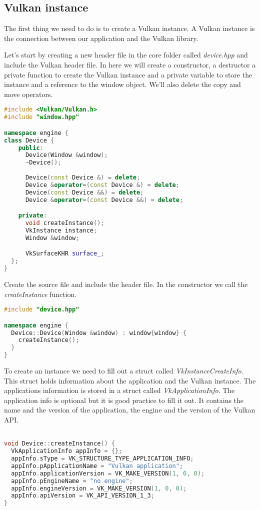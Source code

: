 \documentclass[12pt]{report} \usepackage{preamble}
\begin{document}
\subsection{Vulkan instance}

The first thing we need to do is to create a Vulkan instance.
A Vulkan instance is the connection between our application and the Vulkan library.

Let's start by creating a new header file in the core folder called \textit{device.hpp}
and include the Vulkan header file. In here we will create a constructor, a destructor
a private function to create the Vulkan instance and a private variable to store the instance
and a reference to the window object. We'll also delete the copy and move operators.

\begin{lstlisting}[language=C++]
#include <Vulkan/Vulkan.h>
#include "window.hpp"

namespace engine {
class Device {
    public:
      Device(Window &window);
      ~Device();
      
      Device(const Device &) = delete;
      Device &operator=(const Device &) = delete;
      Device(const Device &&) = delete;
      Device &operator=(const Device &&) = delete;

    private:
      void createInstance();
      VkInstance instance;
      Window &window;

      VkSurfaceKHR surface_;
  };
}
\end{lstlisting}

Create the source file and include the header file. In the constructor we call the
\textit{createInstance} function.

\begin{lstlisting}[language=C++]
#include "device.hpp"

namespace engine {
  Device::Device(Window &window) : window{window} {
    createInstance();
  }
}
\end{lstlisting}

To create an instance we need to fill out a struct called \textit{VkInstanceCreateInfo}.
This struct holds information about the application and the Vulkan instance.
The applications information is stored in a struct called \textit{VkApplicationInfo}.
The application info is optional but it is good practice to fill it out. It contains
the name and the version of the application, the engine and the version of the Vulkan \ac{API}.

\begin{lstlisting}[language=C++]

void Device::createInstance() {
  VkApplicationInfo appInfo = {};
  appInfo.sType = VK_STRUCTURE_TYPE_APPLICATION_INFO;
  appInfo.pApplicationName = "Vulkan application";
  appInfo.applicationVersion = VK_MAKE_VERSION(1, 0, 0);
  appInfo.pEngineName = "no engine";
  appInfo.engineVersion = VK_MAKE_VERSION(1, 0, 0);
  appInfo.apiVersion = VK_API_VERSION_1_3;
}
\end{lstlisting}
\end{document}
